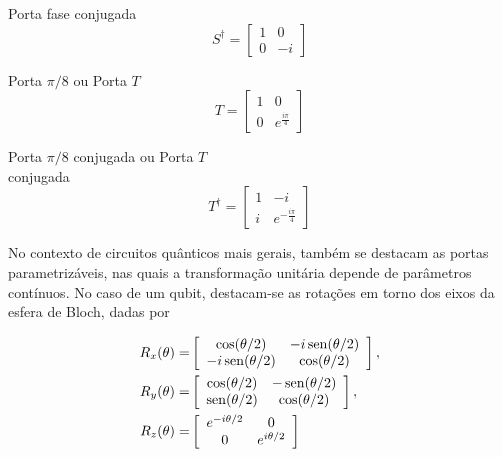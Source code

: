 \begin{enumerate}
\begin{minipage}{0.5\textwidth}
        \item Porta fase conjugada
        $$
            S^{\dagger}=\left[\begin{array}{cc}
                 1 & 0 \\
                 0 & -i
            \end{array}\right]
        $$
    \end{minipage}
    \begin{minipage}{0.5\textwidth}
        \item Porta $\pi/8$ ou Porta $T$
        $$
            T=\left[\begin{array}{cc}
                 1 & 0 \\
                 0 & e^{\frac{i\pi}{4}}
            \end{array}\right]
        $$
    \end{minipage}
    \begin{minipage}{0.5\textwidth}
        \item Porta $\pi/8$ conjugada ou Porta $T$ \\   
        conjugada
        $$
            T^{\dagger}=\left[\begin{array}{cc}
                 1 & -i \\
                 i & e^{-\frac{i\pi}{4}}
            \end{array}\right]
        $$
    \end{minipage}
    \end{enumerate}

No contexto de circuitos quânticos mais gerais, também se destacam as portas parametrizáveis, nas quais a transformação unitária depende de parâmetros contínuos. No caso de um qubit, destacam-se as rotações em torno dos eixos da esfera de Bloch, dadas por

\begin{align}
    R_x(\theta)= &
    \left[\begin{array}{cc}
        \cos(\theta/2) & -i\operatorname{sen}(\theta/2)\\
        -i\operatorname{sen}(\theta/2) & \cos(\theta/2)
    \end{array}\right], \\
    R_y(\theta)= &
    \left[\begin{array}{cc}
        \cos(\theta/2) & -\operatorname{sen}(\theta/2)\\
        \operatorname{sen}(\theta/2) & \cos(\theta/2)
    \end{array}\right], \\
    R_z(\theta)= &
    \left[\begin{array}{cc}
        e^{-i\theta/2} & 0\\
        0 & e^{i\theta/2}
    \end{array} \right]
\end{align}

